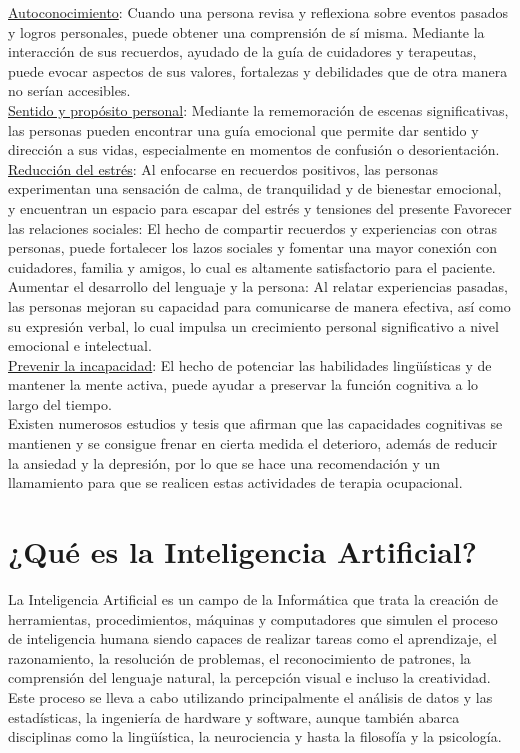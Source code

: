 \underline{Autoconocimiento}: Cuando una persona revisa y reflexiona sobre eventos pasados y logros personales, puede obtener una comprensión de sí misma. Mediante la interacción de sus recuerdos, ayudado de la guía de cuidadores y terapeutas, puede evocar aspectos de sus valores, fortalezas y debilidades que de otra manera no serían accesibles.\\

\underline{Sentido y propósito personal}: Mediante la rememoración de escenas significativas, las personas pueden encontrar una guía emocional que permite dar sentido y dirección a sus vidas, especialmente en momentos de confusión o desorientación.\\

\underline{Reducción del estrés}: Al enfocarse en recuerdos positivos, las personas experimentan una sensación de calma, de tranquilidad y de bienestar emocional, y encuentran un espacio para escapar del estrés y tensiones del presente
Favorecer las relaciones sociales: El hecho de compartir recuerdos y experiencias con otras personas, puede fortalecer los lazos sociales y fomentar una mayor conexión con cuidadores, familia y amigos, lo cual es altamente satisfactorio para el paciente.\\

Aumentar el desarrollo del lenguaje y la persona: Al relatar experiencias pasadas, las personas mejoran su capacidad para comunicarse de manera efectiva, así como su expresión verbal, lo cual impulsa un crecimiento personal significativo a nivel emocional e intelectual.\\

\underline{Prevenir la incapacidad}: El hecho de potenciar las habilidades lingüísticas y de mantener la mente activa, puede ayudar a preservar la función cognitiva a lo largo del tiempo. \\

Existen numerosos estudios y tesis que afirman que las capacidades cognitivas se mantienen y se consigue frenar en cierta medida el deterioro, además de reducir la ansiedad y la depresión, por lo que se hace una recomendación y un llamamiento para que se realicen estas actividades de terapia ocupacional.\\

\section{¿Qué es la Inteligencia Artificial?}

La Inteligencia Artificial es un campo de la Informática que trata la creación de herramientas, procedimientos, máquinas y computadores que simulen el proceso de inteligencia humana siendo capaces de realizar tareas como el aprendizaje, el razonamiento, la resolución de problemas, el reconocimiento de patrones, la comprensión del lenguaje natural, la percepción visual e incluso la creatividad. Este proceso se lleva a cabo utilizando principalmente el análisis de datos y las estadísticas, la ingeniería de hardware y software, aunque también abarca disciplinas como la lingüística, la neurociencia y hasta la filosofía y la psicología.\\

